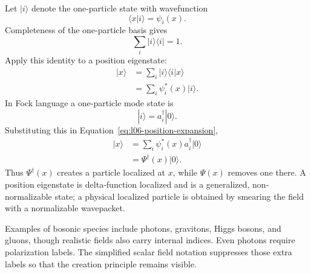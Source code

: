 Let \(|i\rangle\) denote the one-particle state with wavefunction
\begin{equation}
\langle x|i\rangle=\psi_i(x).
\end{equation}
Completeness of the one-particle basis gives
\begin{equation}
\sum_i|i\rangle\langle i|=1.
\label{eq:l06-completeness}
\end{equation}
Apply this identity to a position eigenstate:
\begin{align}
|x\rangle
&=\sum_i|i\rangle\langle i|x\rangle \\
&=\sum_i\psi_i^*(x)|i\rangle.
\label{eq:l06-position-expansion}
\end{align}
In Fock language a one-particle mode state is
\begin{equation}
|i\rangle=a_i^\dagger|0\rangle.
\end{equation}
Substituting this in Equation~\eqref{eq:l06-position-expansion},
\begin{align}
|x\rangle
&=\sum_i\psi_i^*(x)a_i^\dagger|0\rangle \\
&=\Psi^\dagger(x)|0\rangle.
\label{eq:l06-local-creation}
\end{align}
Thus \(\Psi^\dagger(x)\) creates a particle localized at \(x\), while \(\Psi(x)\) removes one there. A position eigenstate is delta-function localized and is a generalized, non-normalizable state; a physical localized particle is obtained by smearing the field with a normalizable wavepacket.

\begin{classroomqa}
\end{classroomqa}

Examples of bosonic species include photons, gravitons, Higgs bosons, and gluons, though realistic fields also carry internal indices. Even photons require polarization labels. The simplified scalar field notation suppresses those extra labels so that the creation principle remains visible.

